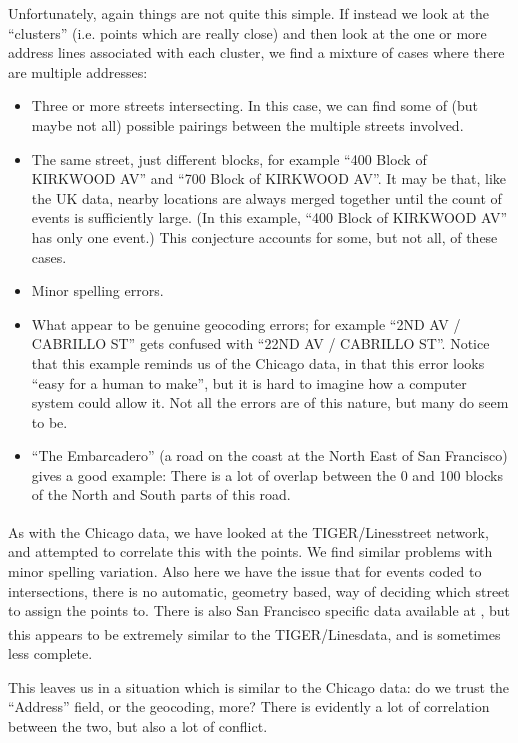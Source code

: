 \documentclass[twoside,a4paper,twocolumn,10pt]{article}
\theoremstyle{plain}
\theoremstyle{definition}
\newcommand{\regsym}{\textsuperscript{\textregistered}}
\begin{document}
Unfortunately, again things are not quite this simple.  If instead we look at the ``clusters''
(i.e. points which are really close) and then look at the one or more address lines associated
with each cluster, we find a mixture of cases where there are multiple addresses:
\begin{itemize}
\item Three or more streets intersecting.  In this case, we can find some of (but maybe not all)
  possible pairings between the multiple streets involved.
\item The same street, just different blocks, for example ``400 Block of KIRKWOOD AV'' and
  ``700 Block of KIRKWOOD AV''.  It may be that, like the UK data, nearby locations are always
  merged together until the count of events is sufficiently large.  (In this example,
  ``400 Block of KIRKWOOD AV'' has only one event.)  This conjecture accounts for some, but
  not all, of these cases.
\item Minor spelling errors.
\item What appear to be genuine geocoding errors; for example ``2ND AV / CABRILLO ST''
  gets confused with ``22ND AV / CABRILLO ST''.  Notice that this example reminds us of the
  Chicago data, in that this error looks ``easy for a human to make'', but it is hard to
  imagine how a computer system could allow it.  Not all the errors are of this nature,
  but many do seem to be.
\item ``The Embarcadero'' (a road on the coast at the North East of San Francisco)
  gives a good example: There is a lot of overlap between the 0 and 100 blocks of the North
  and South parts of this road.
\end{itemize}

As with the Chicago data, we have looked at the TIGER/Lines\regsym street network, and
attempted to correlate this with the points.  We find similar problems with minor spelling
variation.  Also here we have the issue that for events coded to intersections, there is
no automatic, geometry based, way of deciding which street to assign the points to.
There is also San Francisco specific data available at \cite{sfgeo}, but this appears to
be extremely similar to the TIGER/Lines\regsym data, and is sometimes less complete.

This leaves us in a situation which is similar to the Chicago data: do we trust the
``Address'' field, or the geocoding, more?  There is evidently a lot of correlation between
the two, but also a lot of conflict.
\end{document}
